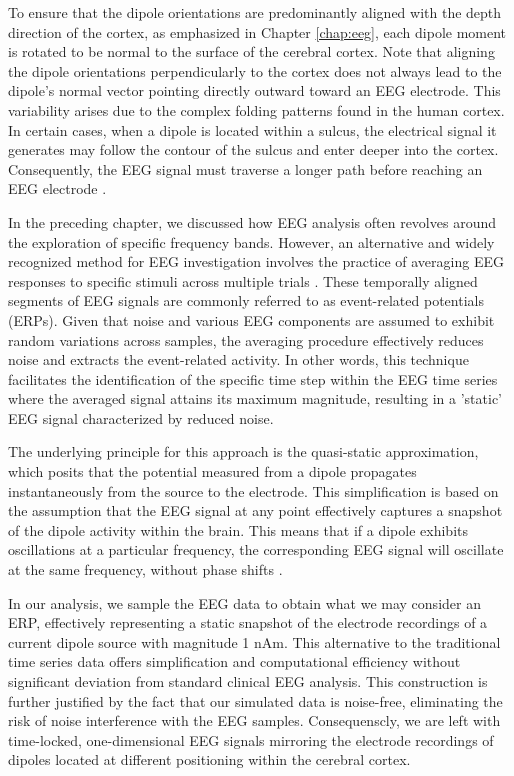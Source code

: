 \documentclass[a4paper, UKenglish, 11pt]{uiomaster}
\begin{document}
To ensure that the dipole orientations are predominantly aligned with the depth direction of the cortex, as emphasized in Chapter \ref{chap:eeg}, each dipole moment is rotated to be normal to the surface of the cerebral cortex. Note that aligning the dipole orientations perpendicularly to the cortex does not always lead to the dipole's normal vector pointing directly outward toward an EEG electrode. This variability arises due to the complex folding patterns found in the human cortex. In certain cases, when a dipole is located within a sulcus, the electrical signal it generates may follow the contour of the sulcus and enter deeper into the cortex. Consequently, the EEG signal must traverse a longer path before reaching an EEG electrode \cite{naess2021biophysically}.

In the preceding chapter, we discussed how EEG analysis often revolves around the exploration of specific frequency bands. However, an alternative and widely recognized method for EEG investigation involves the practice of averaging EEG responses to specific stimuli across multiple trials \cite{kropotov2016functional}. These temporally aligned segments of EEG signals are commonly referred to as event-related potentials (ERPs). Given that noise and various EEG components are assumed to exhibit random variations across samples, the averaging procedure effectively reduces noise and extracts the event-related activity. In other words, this technique facilitates the identification of the specific time step within the EEG time series where the averaged signal attains its maximum magnitude, resulting in a 'static' EEG signal characterized by reduced noise.

The underlying principle for this approach is the quasi-static approximation, which posits that the potential measured from a dipole propagates instantaneously from the source to the electrode. This simplification is based on the assumption that the EEG signal at any point effectively captures a snapshot of the dipole activity within the brain. This means that if a dipole exhibits oscillations at a particular frequency, the corresponding EEG signal will oscillate at the same frequency, without phase shifts \cite{plonsey1967considerations}.

In our analysis, we sample the EEG data to obtain what we may consider an ERP, effectively representing a static snapshot of the electrode recordings of a current dipole source with magnitude 1 nAm. This alternative to the traditional time series data offers simplification and computational efficiency without significant deviation from standard clinical EEG analysis. This construction is further justified by the fact that our simulated data is noise-free, eliminating the risk of noise interference with the EEG samples. Consequenscly, we are left with time-locked, one-dimensional EEG signals mirroring the electrode recordings of dipoles located at different positioning within the cerebral cortex.
\end{document}
